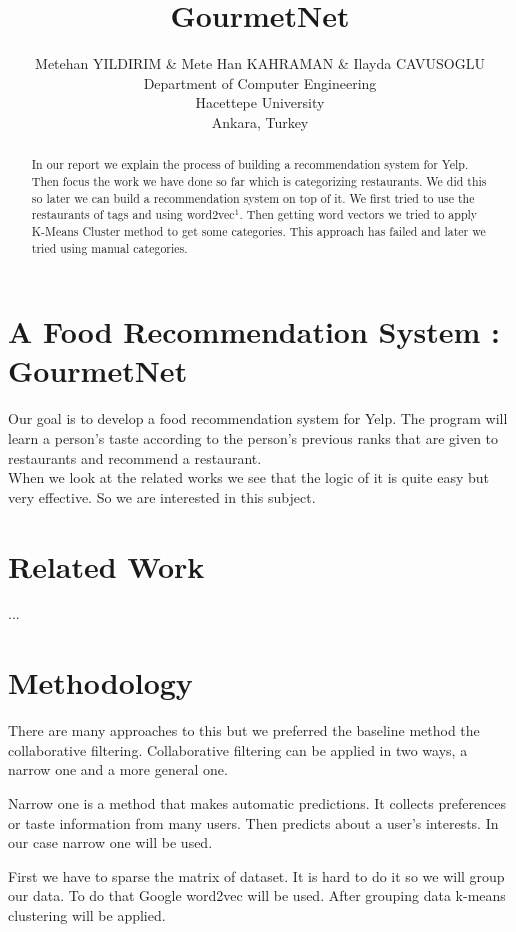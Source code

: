\documentclass{article} %
\title{GourmetNet}
\author{Metehan YILDIRIM \& Mete Han KAHRAMAN \& Ilayda CAVUSOGLU  \\
Department of Computer Engineering\\
Hacettepe University\\
Ankara, Turkey \\
}
\begin{document}
\maketitle

\begin{abstract}
In our report we explain the process of building a recommendation system for Yelp. Then focus the work we have done so far which is categorizing restaurants. We did this so later we can build a recommendation system on top of it. We first tried to use the restaurants of tags and using word2vec$^1$. Then getting word vectors we tried to apply K-Means Cluster method to get some categories. This approach has failed and later we tried using manual categories.
\end{abstract}

\section{A Food Recommendation System : GourmetNet}

Our goal is to develop a food recommendation system for Yelp. The program will learn a person's taste according to the person's previous ranks that are given to restaurants and recommend a restaurant.\\

When we look at the related works we see that the logic of it is quite easy but very effective. So we are interested in this subject.\\
 
\section{Related Work}

...


\section{Methodology}

There are many approaches to this but we preferred the baseline method the collaborative filtering. Collaborative filtering can be applied in two ways, a narrow one and a more general one. 


Narrow one is a method that makes automatic predictions. It collects preferences or taste information from many users. Then predicts about a user's interests. In our case narrow one will be used.



First we have to sparse the matrix of dataset. It is hard to do it so we will group our data. To do that Google word2vec will be used. After grouping data k-means clustering will be applied. 
\end{document}
